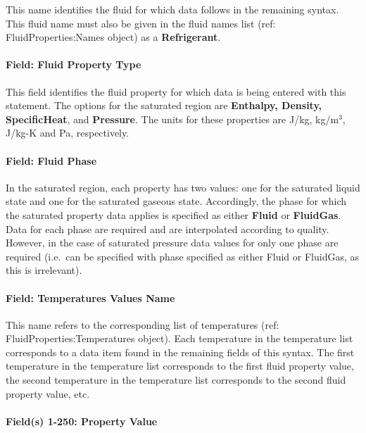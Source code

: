 This name identifies the fluid for which data follows in the remaining syntax. This fluid name must also be given in the fluid names list (ref: FluidProperties:Names object) as a \textbf{Refrigerant}.

\paragraph{Field: Fluid Property Type}\label{field-fluid-property-type}

This field identifies the fluid property for which data is being entered with this statement. The options for the saturated region are \textbf{Enthalpy, Density, SpecificHeat}, and \textbf{Pressure}. The units for these properties are J/kg, kg/m\(^{3}\), J/kg-K and Pa, respectively.

\paragraph{Field: Fluid Phase}\label{field-fluid-phase}

In the saturated region, each property has two values: one for the saturated liquid state and one for the saturated gaseous state. Accordingly, the phase for which the saturated property data applies is specified as either \textbf{Fluid} or \textbf{FluidGas}. Data for each phase are required and are interpolated according to quality. However, in the case of saturated pressure data values for only one phase are required (i.e.~can be specified with phase specified as either Fluid or FluidGas, as this is irrelevant).

\paragraph{Field: Temperatures Values Name}\label{field-temperatures-values-name}

This name refers to the corresponding list of temperatures (ref: FluidProperties:Temperatures object). Each temperature in the temperature list corresponds to a data item found in the remaining fields of this syntax. The first temperature in the temperature list corresponds to the first fluid property value, the second temperature in the temperature list corresponds to the second fluid property value, etc.

\paragraph{Field(s) 1-250: Property Value}\label{fields-1-250-property-value}

